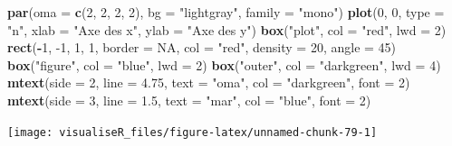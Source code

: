 \documentclass[]{article}
\newenvironment{Shaded}{\begin{snugshade}}{\end{snugshade}}
\newcommand{\DataTypeTok}[1]{\textcolor[rgb]{0.13,0.29,0.53}{#1}}
\newcommand{\DecValTok}[1]{\textcolor[rgb]{0.00,0.00,0.81}{#1}}
\newcommand{\FloatTok}[1]{\textcolor[rgb]{0.00,0.00,0.81}{#1}}
\newcommand{\KeywordTok}[1]{\textcolor[rgb]{0.13,0.29,0.53}{\textbf{#1}}}
\newcommand{\NormalTok}[1]{#1}
\newcommand{\OperatorTok}[1]{\textcolor[rgb]{0.81,0.36,0.00}{\textbf{#1}}}
\newcommand{\OtherTok}[1]{\textcolor[rgb]{0.56,0.35,0.01}{#1}}
\newcommand{\StringTok}[1]{\textcolor[rgb]{0.31,0.60,0.02}{#1}}
\begin{document}
\begin{Shaded}
\begin{Highlighting}[]
\KeywordTok{par}\NormalTok{(}\DataTypeTok{oma =} \KeywordTok{c}\NormalTok{(}\DecValTok{2}\NormalTok{, }\DecValTok{2}\NormalTok{, }\DecValTok{2}\NormalTok{, }\DecValTok{2}\NormalTok{), }\DataTypeTok{bg =} \StringTok{"lightgray"}\NormalTok{, }\DataTypeTok{family =} \StringTok{"mono"}\NormalTok{)}
\KeywordTok{plot}\NormalTok{(}\DecValTok{0}\NormalTok{, }\DecValTok{0}\NormalTok{, }\DataTypeTok{type =} \StringTok{"n"}\NormalTok{, }\DataTypeTok{xlab =} \StringTok{"Axe des x"}\NormalTok{, }\DataTypeTok{ylab =} \StringTok{"Axe des y"}\NormalTok{)}
\KeywordTok{box}\NormalTok{(}\StringTok{"plot"}\NormalTok{, }\DataTypeTok{col =} \StringTok{"red"}\NormalTok{, }\DataTypeTok{lwd =} \DecValTok{2}\NormalTok{)}
\KeywordTok{rect}\NormalTok{(}\OperatorTok{-}\DecValTok{1}\NormalTok{, }\DecValTok{-1}\NormalTok{, }\DecValTok{1}\NormalTok{, }\DecValTok{1}\NormalTok{, }\DataTypeTok{border =} \OtherTok{NA}\NormalTok{, }\DataTypeTok{col =} \StringTok{"red"}\NormalTok{, }\DataTypeTok{density =} \DecValTok{20}\NormalTok{, }\DataTypeTok{angle =} \DecValTok{45}\NormalTok{)}
\KeywordTok{box}\NormalTok{(}\StringTok{"figure"}\NormalTok{, }\DataTypeTok{col =} \StringTok{"blue"}\NormalTok{, }\DataTypeTok{lwd =} \DecValTok{2}\NormalTok{)}
\KeywordTok{box}\NormalTok{(}\StringTok{"outer"}\NormalTok{, }\DataTypeTok{col =} \StringTok{"darkgreen"}\NormalTok{, }\DataTypeTok{lwd =} \DecValTok{4}\NormalTok{)}
\KeywordTok{mtext}\NormalTok{(}\DataTypeTok{side =} \DecValTok{2}\NormalTok{, }\DataTypeTok{line =} \FloatTok{4.75}\NormalTok{, }\DataTypeTok{text =} \StringTok{"oma"}\NormalTok{, }\DataTypeTok{col =} \StringTok{"darkgreen"}\NormalTok{, }\DataTypeTok{font =} \DecValTok{2}\NormalTok{)}
\KeywordTok{mtext}\NormalTok{(}\DataTypeTok{side =} \DecValTok{3}\NormalTok{, }\DataTypeTok{line =} \FloatTok{1.5}\NormalTok{, }\DataTypeTok{text =} \StringTok{"mar"}\NormalTok{, }\DataTypeTok{col =} \StringTok{"blue"}\NormalTok{, }\DataTypeTok{font =} \DecValTok{2}\NormalTok{)}
\end{Highlighting}
\end{Shaded}

\begin{center}\texttt{[image: visualiseR\_files/figure-latex/unnamed-chunk-79-1]} \end{center}
\end{document}
